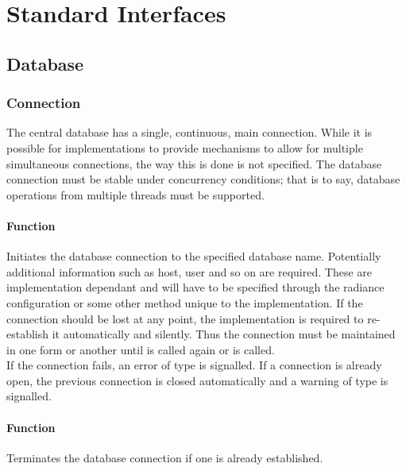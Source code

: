 \chapter{Standard Interfaces} \label{sec:standard interfaces}
\section{Database}
\subsection{Connection}
The central database has a single, continuous, main connection. While it is possible for implementations to provide mechanisms to allow for multiple simultaneous connections, the way this is done is not specified. The database connection must be stable under concurrency conditions; that is to say, database operations from multiple threads must be supported.

\subsubsection{Function }
Initiates the database connection to the specified database name. Potentially additional information such as host, user and so on are required. These are implementation dependant and will have to be specified through the radiance configuration or some other method unique to the implementation. If the connection should be lost at any point, the implementation is required to re-establish it automatically and silently. Thus the connection must be maintained in one form or another until  is called again or  is called. \\

\noindent If the connection fails, an error of type  is signalled. If a connection is already open, the previous connection is closed automatically and a warning of type  is signalled.

\subsubsection{Function }
Terminates the database connection if one is already established. \\

